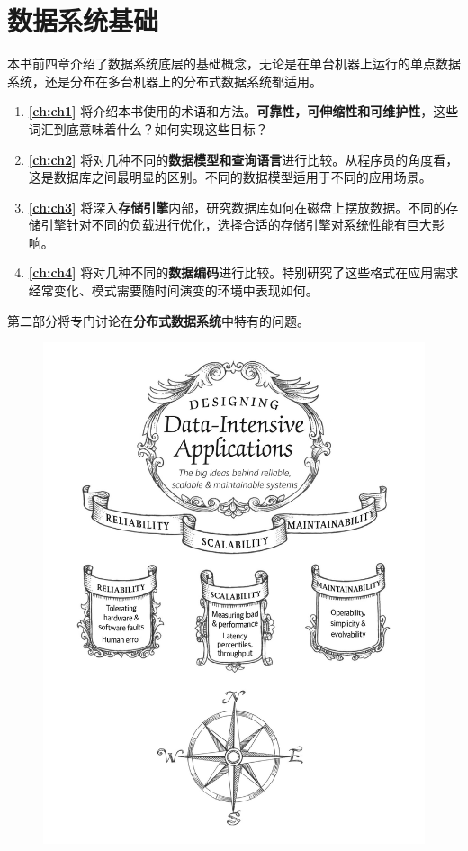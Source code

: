 \documentclass{book}
\begin{document}
\tableofcontents

\part{数据系统基础}
本书前四章介绍了数据系统底层的基础概念，无论是在单台机器上运行的单点数据系统，还是分布在多台机器上的分布式数据系统都适用。

\begin{enumerate}
    \item \textbf{\autoref{ch:ch1}} 将介绍本书使用的术语和方法。\textbf{可靠性，可伸缩性和可维护性}，这些词汇到底意味着什么？如何实现这些目标？
    \item \textbf{\autoref{ch:ch2}} 将对几种不同的\textbf{数据模型和查询语言}进行比较。从程序员的角度看，这是数据库之间最明显的区别。不同的数据模型适用于不同的应用场景。
    \item \textbf{\autoref{ch:ch3}} 将深入\textbf{存储引擎}内部，研究数据库如何在磁盘上摆放数据。不同的存储引擎针对不同的负载进行优化，选择合适的存储引擎对系统性能有巨大影响。
    \item \textbf{\autoref{ch:ch4}} 将对几种不同的\textbf{数据编码}进行比较。特别研究了这些格式在应用需求经常变化、模式需要随时间演变的环境中表现如何。
\end{enumerate}

第二部分将专门讨论在\textbf{分布式数据系统}中特有的问题。

\newpage
\begin{figure}
    \centering
    \includegraphics[width=\textwidth]{img/ch1.jpg}
    \label{fig:ch1}
\end{figure}
\end{document}
